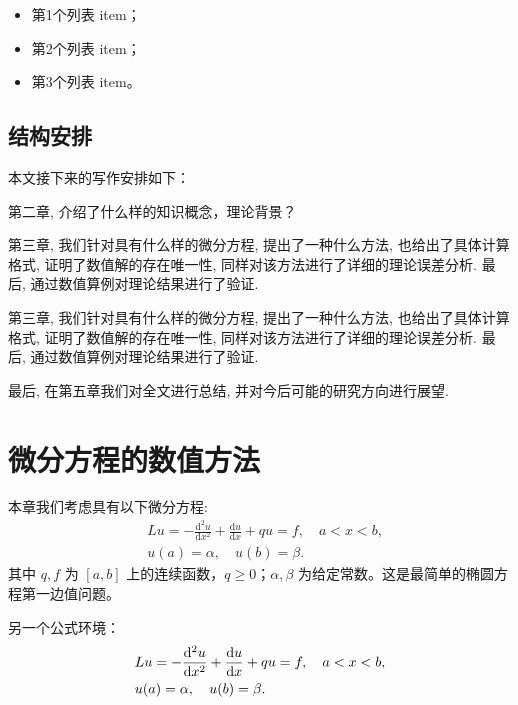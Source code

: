 \documentclass{shnuthesis}
\begin{document}
\begin{itemize}

\item 第1个列表 item；

\item 第2个列表 item；

\item 第3个列表 item。

\end{itemize}



\section{结构安排}

本文接下来的写作安排如下：

第二章,  介绍了什么样的知识概念，理论背景？


第三章, 我们针对具有什么样的微分方程,
提出了一种什么方法, 也给出了具体计算格式,
证明了数值解的存在唯一性,  同样对该方法进行了详细的理论误差分析.
最后, 通过数值算例对理论结果进行了验证.

第三章, 我们针对具有什么样的微分方程,
提出了一种什么方法, 也给出了具体计算格式,
证明了数值解的存在唯一性,  同样对该方法进行了详细的理论误差分析.
最后, 通过数值算例对理论结果进行了验证.


最后,  在第五章我们对全文进行总结, 并对今后可能的研究方向进行展望.



\chapter{微分方程的数值方法}

本章我们考虑具有以下微分方程:
\begin{equation}\label{Equ11}
\begin{aligned}
& L u=-\frac{\mathrm{d}^{2} u}{\mathrm{d} x^{2}}+\frac{\mathrm{d} u}{\mathrm{d} x}+q u=f, \quad a < x < b, \\
&u(a)=\alpha, \quad u(b)=\beta.
\end{aligned}
\end{equation}
其中 $q, f$ 为 $[a,b]$ 上的连续函数，$q \geqslant 0$；$\alpha, \beta$ 为给定常数。这是最简单的椭圆方程第一边值问题。

另一个公式环境：
\begin{eqnarray}\label{Equ12}
\displaystyle
&L u=-\frac{\mathrm{d}^{2} u}{\mathrm{d} x^{2}}+\frac{\mathrm{d} u}{\mathrm{d} x}+q u=f, \quad a < x < b, \\
\displaystyle
&u(a)=\alpha, \quad u(b)=\beta.
\end{eqnarray}
\end{document}
